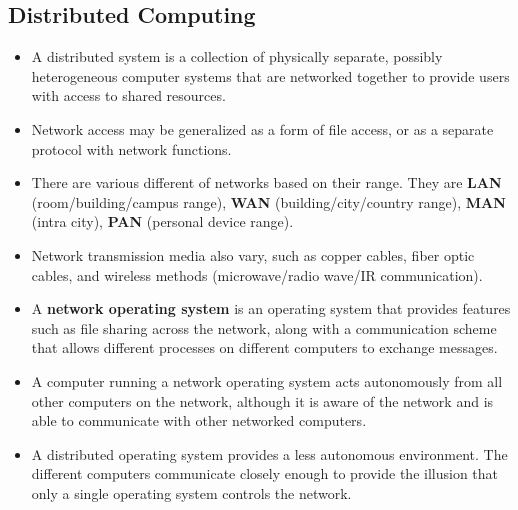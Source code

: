 \documentclass{article}
\theoremstyle{plain}
\theoremstyle{definition}
\begin{document}
\subsection{Distributed Computing}
\begin{itemize}
    \item A distributed system is a collection of physically separate, possibly heterogeneous computer systems that are networked together to provide users with access to shared resources. 
    
    \item Network access may be generalized as a form of file access, or as a separate protocol with network functions. 
    
    \item There are various different of networks based on their range. They are \textbf{LAN} (room/building/campus range), \textbf{WAN} (building/city/country range), \textbf{MAN} (intra city), \textbf{PAN} (personal device range). 
    
    \item Network transmission media also vary, such as copper cables, fiber optic cables, and wireless methods (microwave/radio wave/IR communication).
    
    \item A \textbf{network operating system} is an operating system that provides features such as file sharing across the network, along with a communication scheme that allows different processes on different computers to exchange messages. 
    
    \item A computer running a network operating system acts autonomously from all other computers on the network, although it is aware of the network and is able to communicate with other networked computers.
    
    \item A distributed operating system provides a less autonomous environment. The different computers communicate closely enough to provide the illusion that only a single operating system controls the network.
\end{itemize}
\end{document}
